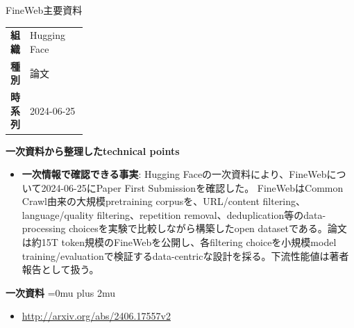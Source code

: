 \begin{technicalnote}{FineWeb}{主要資料}
\begingroup
\begin{tabularx}{\linewidth}{@{}>{\bfseries}p{0.22\linewidth}X@{}}
組織 & Hugging Face \\
種別 & 論文 \\
時系列 & 2024-06-25 \\
\end{tabularx}
\smallskip
\begin{minipage}{\linewidth}
{\bfseries 一次資料から整理したtechnical points}
\begin{itemize}[leftmargin=1.5em,itemsep=0.35em]
\item \textbf{一次情報で確認できる事実}: Hugging Faceの一次資料により、FineWebについて2024-06-25にPaper First Submissionを確認した。 FineWebはCommon Crawl由来の大規模pretraining corpusを、URL/content filtering、language/quality filtering、repetition removal、deduplication等のdata-processing choicesを実験で比較しながら構築したopen datasetである。論文は約15T token規模のFineWebを公開し、各filtering choiceを小規模model training/evaluationで検証するdata-centricな設計を採る。下流性能値は著者報告として扱う。
\end{itemize}
\begin{minipage}{\linewidth}
\begin{samepage}
{\bfseries 一次資料}
\begingroup\sloppy
\Urlmuskip=0mu plus 2mu\relax
\begin{itemize}[leftmargin=1.5em,itemsep=0.25em]
\item {\scriptsize\url{http://arxiv.org/abs/2406.17557v2}}
\end{itemize}
\endgroup
\end{samepage}
\end{minipage}
\end{minipage}
\endgroup
\end{technicalnote}
\medskip

